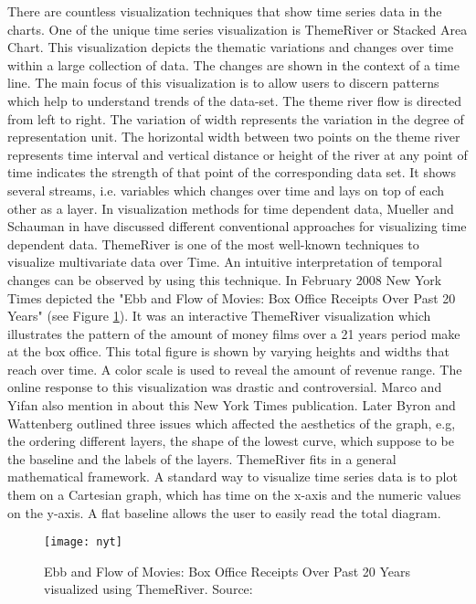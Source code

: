 There are countless visualization techniques that show time series data in the charts. One of the unique time series visualization is ThemeRiver \cite{981848} or Stacked Area Chart. This visualization depicts the thematic variations and changes over time within a large collection of data. The changes are shown in the context of a time line. The main focus of this visualization is to allow users to discern patterns which help to understand trends of the data-set. The theme river flow is directed from left to right. The variation of width represents the variation in the degree of representation unit. The horizontal width between two points on the theme river represents time interval and vertical distance or height of the river at any point of time indicates the strength of that point of the corresponding data set. It shows several streams, i.e. variables which changes over time and lays on top of each other as a layer. In visualization methods for time dependent data, Mueller and Schauman in \cite{1261490} have discussed different conventional approaches for visualizing time dependent data. ThemeRiver is one of the most well-known techniques to visualize multivariate data over Time. An intuitive interpretation of temporal changes can be observed by using this technique. In February 2008 New York Times depicted the "Ebb and Flow of Movies: Box Office Receipts Over Past 20 Years" \cite{boxoffice} (see Figure \ref{fig:nyk}). It was an interactive ThemeRiver visualization which illustrates the pattern of the amount of money films over a 21 years period make at the box office. This total figure is shown by varying heights and widths that reach over time. A color scale is used to reveal the amount of revenue range. The online response to this visualization was drastic and controversial. Marco and Yifan also mention in \cite{CGF12910} about this New York Times publication. Later Byron and Wattenberg \cite{Byron2008} outlined three issues which affected the aesthetics of the graph, e.g, the ordering different layers, the shape of the lowest curve, which suppose to be the baseline and the labels of the layers. ThemeRiver fits in a general mathematical framework. A standard way to visualize time series data is to plot them on a Cartesian graph, which has time on the x-axis and the numeric values on the y-axis. A flat baseline allows the user to easily read the total diagram. 

\begin{figure}
  \begin{center}
    \texttt{[image: nyt]}
    \caption[Ebb and Flow of Movies: Box Office Receipts Over Past 20 Years]{Ebb and Flow of Movies: Box Office Receipts Over Past 20 Years visualized using ThemeRiver. Source:\cite{boxoffice}}
    \label{fig:nyk}
  \end{center}
\end{figure}

